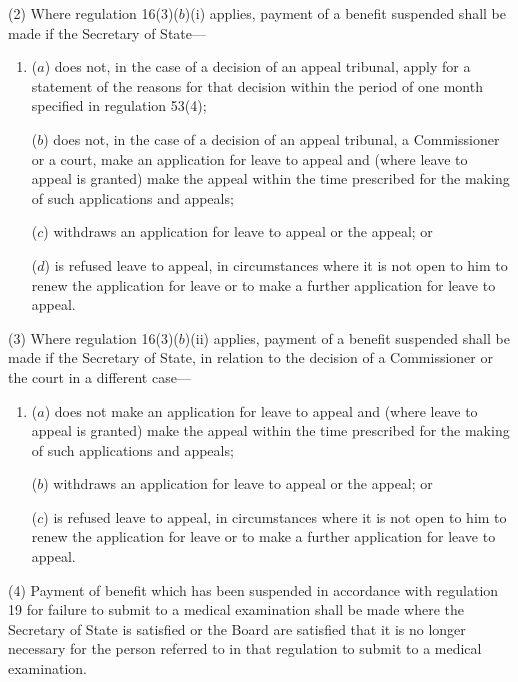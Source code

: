 \documentclass[12pt,a4paper]{article}
\begin{document}
(2) Where regulation 16(3)($b$)(i)  applies, payment of a benefit suspended shall be made if the Secretary of State—
\begin{enumerate}\item[]
($a$) does not, in the case of a decision of an appeal tribunal, apply for a statement of the reasons for that decision within the period of one month specified in regulation 53(4);

($b$) does not, in the case of a decision of an appeal tribunal, a Commissioner or a court, make an application for leave to appeal and (where leave to appeal is granted) make the appeal within the time prescribed for the making of such applications and appeals;

($c$) withdraws an application for leave to appeal or the appeal; or

($d$) is refused leave to appeal, in circumstances where it is not open to him to renew the application for leave or to make a further application for leave to appeal.
\end{enumerate}

(3) Where regulation 16(3)($b$)(ii)  applies, payment of a benefit suspended shall be made if the Secretary of State, in relation to the decision of a Commissioner or the court in a different case—
\begin{enumerate}\item[]
($a$) does not make an application for leave to appeal and (where leave to appeal is granted) make the appeal within the time prescribed for the making of such applications and appeals;

($b$) withdraws an application for leave to appeal or the appeal; or

($c$) is refused leave to appeal, in circumstances where it is not open to him to renew the application for leave or to make a further application for leave to appeal.
\end{enumerate}

(4) Payment of benefit which has been suspended in accordance with regulation 19 for failure to submit to a medical examination shall be made where the Secretary of State is satisfied 
or the Board are satisfied  %
that it is no longer necessary for the person referred to in that regulation to submit to a medical examination.

\end{document}
